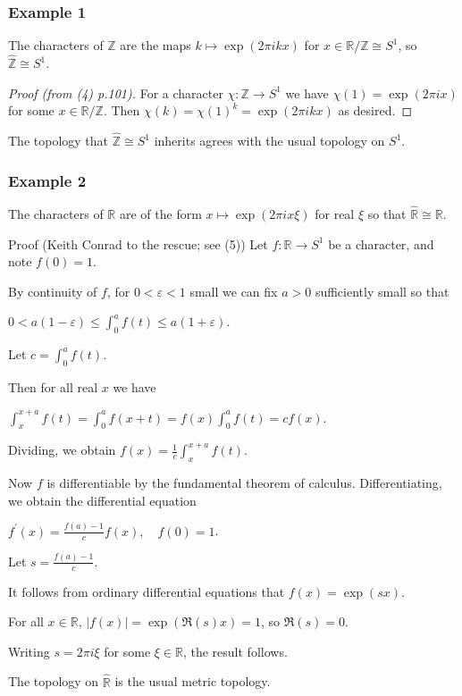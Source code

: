\documentclass[mathserif
, handout
]{beamer}
\begin{document}
\begin{frame}
    \frametitle{Example 1}
The characters of $\mathbb{Z}$ are the maps $k\mapsto \exp(2\pi i k x)$ for $x\in \mathbb{R}/\mathbb{Z}\cong S^1$, so $\widehat{\mathbb{Z}}\cong S^1$. \pause 
\begin{proof}[Proof (from (4) p.101)]
    For a character $\chi\colon \mathbb{Z}\to S^1$ we have $\chi(1) = \exp(2\pi i x)$ for some $x\in \mathbb{R}/\mathbb{Z}$. Then $\chi(k) = \chi(1)^k = \exp(2\pi i k x)$ as desired.
\end{proof}
\pause 

The topology that $\widehat{\mathbb{Z}}\cong S^1$ inherits agrees with the usual topology on $S^1$.
\end{frame}

\begin{frame}
    \frametitle{Example 2}
The characters of $\mathbb{R}$ are of the form $x\mapsto \exp(2\pi i x\xi)$ for real $\xi$ so that $\widehat{\mathbb{R}}\cong\mathbb{R}$.
\pause 
\begin{block}{Proof (Keith Conrad to the rescue; see (5))} %
    Let $f \colon \mathbb{R}\to S^1$ be a character, and note $f(0) = 1$.\pause 

    By continuity of $f$, for $0<\varepsilon<1$ small we can fix $a>0$ sufficiently small so that \begin{center}
        $0<a(1-\varepsilon)\leq \int_0^a f(t)\leq a(1+\varepsilon)$.
    \end{center} Let $c = \int_0^a f(t)$.
\end{block}
\end{frame}

\begin{frame}
    \begin{block}{}
        Then for all real $x$ we have \begin{center}
            $\int_x^{x+a}f(t) = \int_0^a f(x+t) = f(x)\int_0^a f(t) = cf(x)$.
        \end{center} \pause 
        Dividing, we obtain $f(x) = \frac{1}{c}\int_x^{x+a}f(t)$. \pause

        Now $f$ is differentiable by the fundamental theorem of calculus. Differentiating, we obtain the differential equation \begin{center}
            $f^\prime(x) = \frac{f(a)-1}{c} f(x),\quad f(0) = 1$.
        \end{center} Let $s = \frac{f(a)-1}{c}$. \pause 

        It follows from ordinary differential equations that $f(x) = \exp(sx)$. \pause 

        For all $x\in \mathbb{R}$, $|f(x)|= \exp(\Re(s) x)=1$, so $\Re( s) = 0$. \pause 

        Writing $s = 2\pi i \xi$ for some $\xi\in \mathbb{R}$, the result follows. \pushQED{\qed}\qedhere\popQED
    \end{block} \pause The topology on $\widehat{\mathbb{R}}$ is the usual metric topology.
\end{frame}
\end{document}
